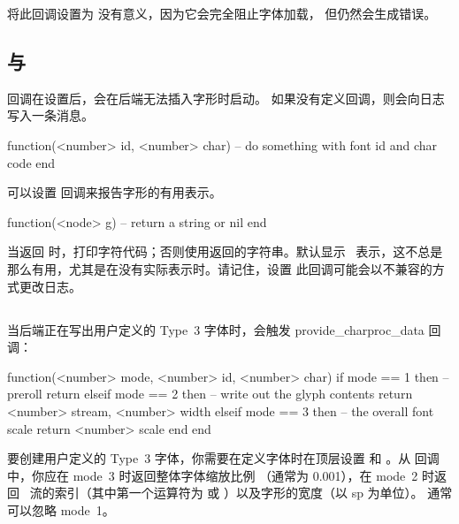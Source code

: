 将此回调设置为  没有意义，因为它会完全阻止字体加载，
但仍然会生成错误。

\subsection{ 与 }


 回调在设置后，会在后端无法插入字形时启动。
如果没有定义回调，则会向日志写入一条消息。

\begin{typing}
function(<number> id, <number> char)
    -- do something with font id and char code
end
\end{typing}

可以设置  回调来报告字形的有用表示。

\begin{typing}
function(<node> g)
    -- return a string or nil
end
\end{typing}

当返回  时，打印字符代码；否则使用返回的字符串。默认显示
\UTF\ 表示，这不总是那么有用，尤其是在没有实际表示时。请记住，设置
此回调可能会以不兼容的方式更改日志。

\subsection{}


当后端正在写出用户定义的 Type~3 字体时，会触发 \type
{provide_charproc_data} 回调：

\begin{typing}
function(<number> mode, <number> id, <number> char)
    if mode == 1 then
        -- preroll
        return
    elseif mode == 2 then
        -- write out the glyph contents
        return <number> stream, <number> width
    elseif mode == 3 then
        -- the overall font scale
        return <number> scale
    end
end
\end{typing}

要创建用户定义的 Type~3 字体，你需要在定义字体时在顶层设置
 和 。从
 回调中，你应在 mode~3 时返回整体字体缩放比例
（通常为 0.001），在 mode~2 时返回 \PDF\ 流的索引（其中第一个运算符为
 或 ）以及字形的宽度（以 sp 为单位）。
通常可以忽略 mode~1。
